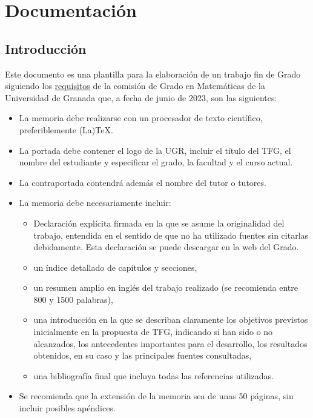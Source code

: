 
\chapter{Documentación}\label{ch:primer-capitulo}

\section{Introducción}
Este documento es una plantilla para la elaboración de un trabajo fin de Grado siguiendo los \href{https://grados.ugr.es/matematicas/pages/infoacademica/tfg/requisitosTFG}{requisitos} de la comisión de Grado en Matemáticas de la Universidad de Granada que, a fecha de junio de 2023, son las siguientes:

\begin{itemize}
  \item La  memoria  debe  realizarse  con  un  procesador  de  texto  científico,  preferiblemente (La)TeX.
  \item La portada  debe contener  el  logo  de  la UGR,  incluir  el  título del TFG, el nombre del estudiante y especificar el grado, la facultad y el curso actual.
  \item La contraportada contendrá además el nombre del tutor o tutores.
  \item La memoria debe necesariamente incluir:
    \begin{itemize}
      \item Declaración explícita firmada en la que se asume la originalidad del trabajo, entendida en el sentido de que no ha utilizado fuentes sin citarlas debidamente. Esta declaración se puede descargar en la web del Grado.
      \item un índice detallado de capítulos y secciones,
      \item un resumen amplio en inglés del trabajo realizado (se recomienda entre 800 y 1500 palabras),
      \item una introducción en la que se describan claramente los objetivos previstos inicialmente en la propuesta de TFG, indicando si han sido o no alcanzados, los antecedentes importantes para el desarrollo, los resultados obtenidos, en su caso y las principales fuentes consultadas,
      \item una bibliografía final que incluya todas las referencias utilizadas.
    \end{itemize}
  \item Se recomienda que la extensión de la memoria sea de unas 50 páginas, sin incluir posibles apéndices.
\end{itemize}


